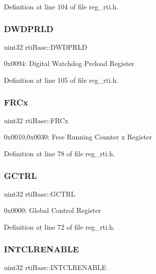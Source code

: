 Definition at line 104 of file reg\+\_\+rti.\+h.

\mbox{\label{structrtiBase_a5944c898bc3f8fb6e2ee18e505b2b36f}} 
\subsubsection{\texorpdfstring{D\+W\+D\+P\+R\+LD}{DWDPRLD}}
{\footnotesize\ttfamily uint32 rti\+Base\+::\+D\+W\+D\+P\+R\+LD}

0x0094\+: Digital Watchdog Preload Register 

Definition at line 105 of file reg\+\_\+rti.\+h.

\mbox{\label{structrtiBase_a79cdb93c17361c9e796c417ae21e260b}} 
\subsubsection{\texorpdfstring{F\+R\+Cx}{FRCx}}
{\footnotesize\ttfamily uint32 rti\+Base\+::\+F\+R\+Cx}

0x0010,0x0030\+: Free Running Counter x Register 

Definition at line 78 of file reg\+\_\+rti.\+h.

\mbox{\label{structrtiBase_a2f8c9631c12d3bd75b1ac897843fd79d}} 
\subsubsection{\texorpdfstring{G\+C\+T\+RL}{GCTRL}}
{\footnotesize\ttfamily uint32 rti\+Base\+::\+G\+C\+T\+RL}

0x0000\+: Global Control Register 

Definition at line 72 of file reg\+\_\+rti.\+h.

\mbox{\label{structrtiBase_aca543b9158f886a6d2412679cdde56c0}} 
\subsubsection{\texorpdfstring{I\+N\+T\+C\+L\+R\+E\+N\+A\+B\+LE}{INTCLRENABLE}}
{\footnotesize\ttfamily uint32 rti\+Base\+::\+I\+N\+T\+C\+L\+R\+E\+N\+A\+B\+LE}

